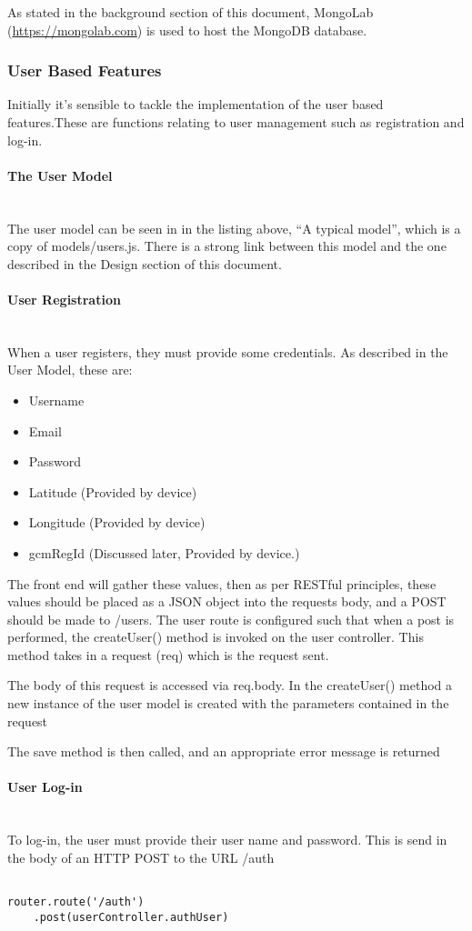 \documentclass[a4paper]{article}
\newcommand{\subsubsubsection}[1]{\paragraph{#1}\mbox{}\\}
\begin{document}
As stated in the background section of this document, MongoLab (\url{https://mongolab.com}) is used to host the MongoDB database.



\subsubsection{User Based Features}
Initially it's sensible to tackle the implementation of the user based features.These are functions relating to user management such as registration and log-in.
\subsubsubsection{The User Model}
The user model can be seen in in the listing above, ``A typical model'', which is a copy of models/users.js. There is a strong link between this model and the one described in the Design section of this document.
\subsubsubsection{User Registration}
When a user registers, they must provide some credentials. As described in the User Model, these are:
\begin{itemize}
  \item Username
  \item Email
  \item Password
  \item Latitude (Provided by device)
  \item Longitude (Provided by device)
  \item gcmRegId (Discussed later, Provided by device.)
\end{itemize}
The front end will gather these values, then as per RESTful principles, these values should be placed as a JSON object into the requests body, and a POST should be made to /users.
The user route is configured such that when a post is performed, the createUser() method is invoked on the user controller.
This method takes in a request (req) which is the request sent. 

The body of this request is accessed via req.body. In the createUser() method a new instance of the user model is created with the parameters contained in the request

The save method is then called, and an appropriate error message is returned


\subsubsubsection{User Log-in}
To log-in, the user must provide their user name and password. This is send in the body of an HTTP POST to the URL /auth

\begin{lstlisting}[label=Route for authenticating a user,caption=Route for authenticating a user]

router.route('/auth')
    .post(userController.authUser)
    
\end{lstlisting}
\end{document}
